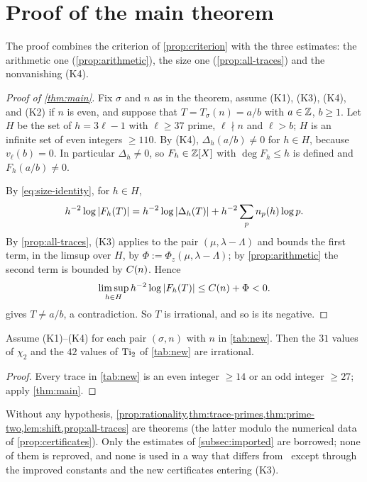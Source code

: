 \section{Proof of the main theorem}\label{sec:proof}

The proof combines the criterion of \cref{prop:criterion} with the three estimates: the arithmetic one
(\cref{prop:arithmetic}), the size one (\cref{prop:all-traces}) and the nonvanishing (K4).

\begin{proof}[Proof of \cref{thm:main}]
Fix $\sigma$ and $n$ as in the theorem, assume (K1), (K3), (K4), and (K2) if $n$ is even, and suppose that
$T=T_\sigma(n)=a/b$ with $a\in\mathbb{Z}$, $b\ge1$. Let $H$ be the set of $h=3\ell-1$ with $\ell\ge37$ prime, $\ell\nmid n$ and
$\ell>b$; $H$ is an infinite set of even integers $\ge110$. By (K4), $\Delta_h(a/b)\ne0$ for $h\in H$, because
$v_\ell(b)=0$. In particular $\Delta_h\ne0$, so $F_h\in\mathbb{Z}[X]$ with $\deg F_h\le h$ is defined and $F_h(a/b)\ne0$.

By \eqref{eq:size-identity}, for $h\in H$,
\[
h^{-2}\log\left\lvert F_h(T)\right\rvert=h^{-2}\log\left\lvert \Delta_h(T)\right\rvert+h^{-2}\sum_pn_p(h)\log p .
\]
By \cref{prop:all-traces}, (K3) applies to the pair $(\mu,\lambda-\Lambda)$ and bounds the first term, in the limsup over
$H$, by $\Phi:=\Phi_z(\mu,\lambda-\Lambda)$; by \cref{prop:arithmetic} the second term is bounded by $C(n)$.
Hence
\[
\limsup_{h\in H}h^{-2}\log\left\lvert F_h(T)\right\rvert\le C(n)+\Phi<0 .
\]
 gives $T\ne a/b$, a contradiction. So $T$ is irrational, and so is its negative.
\end{proof}

\begin{corollary}\label{cor:new}
Assume \textup{(K1)--(K4)} for each pair $(\sigma,n)$ with $n$ in \cref{tab:new}. Then the $31$ values of $\chi_2$
and the $42$ values of $\operatorname{Ti}_2$ of \cref{tab:new} are irrational.
\end{corollary}

\begin{proof}
Every trace in \cref{tab:new} is an even integer $\ge14$ or an odd integer $\ge27$; apply \cref{thm:main}.
\end{proof}

\begin{remark}
Without any hypothesis, \cref{prop:rationality,thm:trace-primes,thm:prime-two,lem:shift,prop:all-traces}
are theorems (the latter modulo the numerical data of \cref{prop:certificates}). Only the estimates of
\cref{subsec:imported} are borrowed; none of them is reproved, and none is used in a way that differs from~\Kri{}
except through the improved constants and the new certificates entering (K3).
\end{remark}
